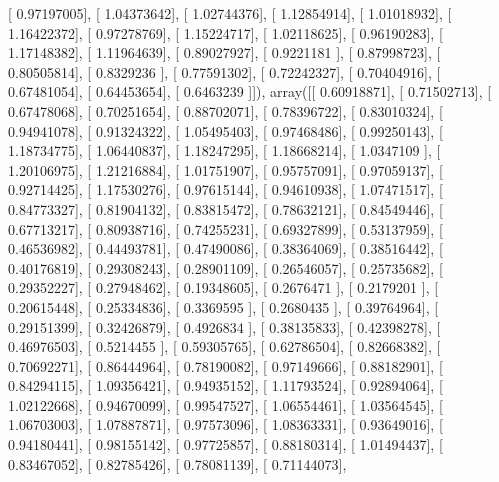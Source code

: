 \documentclass{article}
\begin{document}
       [ 0.97197005],
       [ 1.04373642],
       [ 1.02744376],
       [ 1.12854914],
       [ 1.01018932],
       [ 1.16422372],
       [ 0.97278769],
       [ 1.15224717],
       [ 1.02118625],
       [ 0.96190283],
       [ 1.17148382],
       [ 1.11964639],
       [ 0.89027927],
       [ 0.9221181 ],
       [ 0.87998723],
       [ 0.80505814],
       [ 0.8329236 ],
       [ 0.77591302],
       [ 0.72242327],
       [ 0.70404916],
       [ 0.67481054],
       [ 0.64453654],
       [ 0.6463239 ]]), array([[ 0.60918871],
       [ 0.71502713],
       [ 0.67478068],
       [ 0.70251654],
       [ 0.88702071],
       [ 0.78396722],
       [ 0.83010324],
       [ 0.94941078],
       [ 0.91324322],
       [ 1.05495403],
       [ 0.97468486],
       [ 0.99250143],
       [ 1.18734775],
       [ 1.06440837],
       [ 1.18247295],
       [ 1.18668214],
       [ 1.0347109 ],
       [ 1.20106975],
       [ 1.21216884],
       [ 1.01751907],
       [ 0.95757091],
       [ 0.97059137],
       [ 0.92714425],
       [ 1.17530276],
       [ 0.97615144],
       [ 0.94610938],
       [ 1.07471517],
       [ 0.84773327],
       [ 0.81904132],
       [ 0.83815472],
       [ 0.78632121],
       [ 0.84549446],
       [ 0.67713217],
       [ 0.80938716],
       [ 0.74255231],
       [ 0.69327899],
       [ 0.53137959],
       [ 0.46536982],
       [ 0.44493781],
       [ 0.47490086],
       [ 0.38364069],
       [ 0.38516442],
       [ 0.40176819],
       [ 0.29308243],
       [ 0.28901109],
       [ 0.26546057],
       [ 0.25735682],
       [ 0.29352227],
       [ 0.27948462],
       [ 0.19348605],
       [ 0.2676471 ],
       [ 0.2179201 ],
       [ 0.20615448],
       [ 0.25334836],
       [ 0.3369595 ],
       [ 0.2680435 ],
       [ 0.39764964],
       [ 0.29151399],
       [ 0.32426879],
       [ 0.4926834 ],
       [ 0.38135833],
       [ 0.42398278],
       [ 0.46976503],
       [ 0.5214455 ],
       [ 0.59305765],
       [ 0.62786504],
       [ 0.82668382],
       [ 0.70692271],
       [ 0.86444964],
       [ 0.78190082],
       [ 0.97149666],
       [ 0.88182901],
       [ 0.84294115],
       [ 1.09356421],
       [ 0.94935152],
       [ 1.11793524],
       [ 0.92894064],
       [ 1.02122668],
       [ 0.94670099],
       [ 0.99547527],
       [ 1.06554461],
       [ 1.03564545],
       [ 1.06703003],
       [ 1.07887871],
       [ 0.97573096],
       [ 1.08363331],
       [ 0.93649016],
       [ 0.94180441],
       [ 0.98155142],
       [ 0.97725857],
       [ 0.88180314],
       [ 1.01494437],
       [ 0.83467052],
       [ 0.82785426],
       [ 0.78081139],
       [ 0.71144073],
\end{document}
